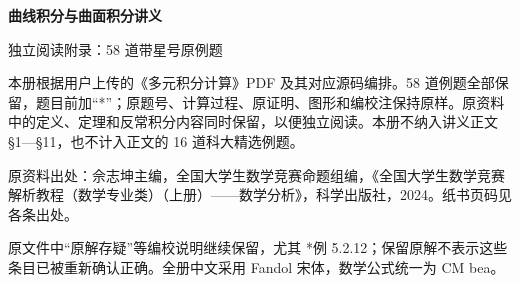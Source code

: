 \documentclass[11pt,a4paper]{article}
\begin{document}
\begin{center}{\LARGE\bfseries 曲线积分与曲面积分讲义\par}\vspace{7pt}
{\large 独立阅读附录：58 道带星号原例题\par}\end{center}
本册根据用户上传的《多元积分计算》PDF 及其对应源码编排。58 道例题全部保留，题目前加“*”；原题号、计算过程、原证明、图形和编校注保持原样。原资料中的定义、定理和反常积分内容同时保留，以便独立阅读。本册不纳入讲义正文 §1—§11，也不计入正文的 16 道科大精选例题。

原资料出处：佘志坤主编，全国大学生数学竞赛命题组编，《全国大学生数学竞赛解析教程（数学专业类）（上册）——数学分析》，科学出版社，2024。纸书页码见各条出处。

原文件中“原解存疑”等编校说明继续保留，尤其 *例 5.2.12；保留原解不表示这些条目已被重新确认正确。全册中文采用 Fandol 宋体，数学公式统一为 CM bea。
\hypertarget{lecture-toc}{}\begingroup\small\setlength{\parskip}{0pt}\tableofcontents\endgroup\clearpage






\end{document}
